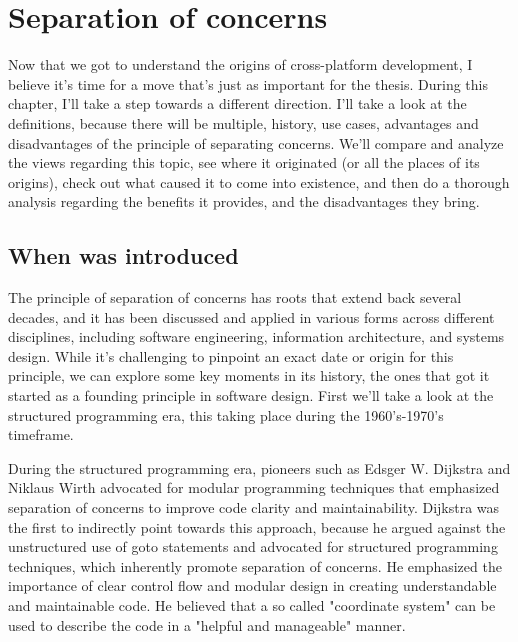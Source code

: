 \chapter{Separation of concerns}
Now that we got to understand the origins of cross-platform development, I believe it's time for a move that's just as important for the thesis.
During this chapter, I'll take a step towards a different direction.
I'll take a look at the definitions, because there will be multiple, history, use cases, advantages and disadvantages of the principle of separating concerns.
We'll compare and analyze the views regarding this topic, see where it originated (or all the places of its origins), 
check out what caused it to come into existence, and then do a thorough analysis regarding the benefits it provides, and the disadvantages they bring.



\section{When was introduced}
The principle of separation of concerns has roots that extend back several decades, and it has been discussed and applied in various forms across different disciplines, including software engineering, information architecture, and systems design.
While it's challenging to pinpoint an exact date or origin for this principle, we can explore some key moments in its history, the ones that got it started as a founding principle in software design.
First we'll take a look at the structured programming era, this taking place during the 1960's-1970's timeframe.
\par
During the structured programming era, pioneers such as Edsger W.
Dijkstra and Niklaus Wirth advocated for modular programming techniques that emphasized separation of concerns to improve code clarity and maintainability.
Dijkstra was the first to indirectly point towards this approach, because he argued against the unstructured use of goto statements and advocated for structured programming techniques, which inherently promote separation of concerns.
He emphasized the importance of clear control flow and modular design in creating understandable and maintainable code.
He believed that a so called "coordinate system"\cite{firstDefinitionPrinciple} can be used to describe the code in a "helpful and manageable"\cite{firstDefinitionPrinciple} manner.


